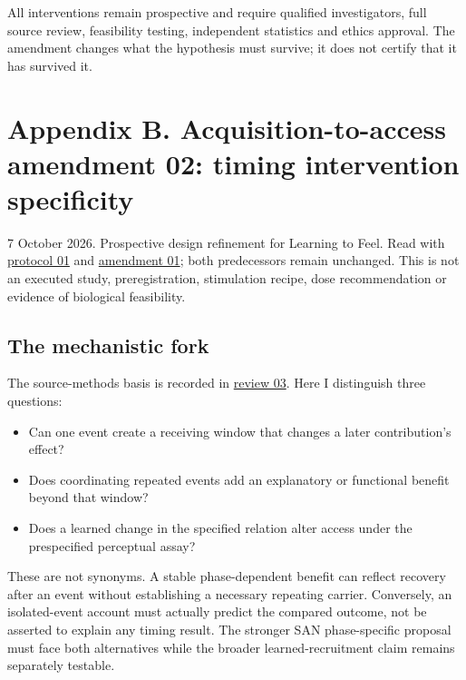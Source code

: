 \documentclass[
  american,
  11pt,
  letterpaper,
]{article}
\providecommand{\tightlist}{%
  \setlength{\itemsep}{0pt}\setlength{\parskip}{0pt}}
\begin{document}
All interventions remain prospective and require qualified investigators, full source review, feasibility testing, independent statistics and ethics approval. The amendment changes what the hypothesis must survive; it does not certify that it has survived it.

\clearpage
\endgroup
\hypertarget{appendix-b}{}

\section{Appendix B. Acquisition-to-access amendment 02: timing intervention specificity}\label{appendix-b.-acquisition-to-access-amendment-02-timing-intervention-specificity}

7 October 2026. Prospective design refinement for Learning to Feel. Read with \href{https://github.com/v5ma/v5ma.github.io/blob/master/papers/companions/learning-to-feel-v1.0/ARTIFACT-AVAILABILITY.md#artifact-1}{protocol 01} and \href{https://raw.githubusercontent.com/v5ma/v5ma.github.io/master/papers/companions/learning-to-feel-v1.0/Learning-to-Feel-Technical-Supplement-v1.0.pdf\#appendix-a}{amendment 01}; both predecessors remain unchanged. This is not an executed study, preregistration, stimulation recipe, dose recommendation or evidence of biological feasibility.

\subsection{The mechanistic fork}\label{the-mechanistic-fork}

The source-methods basis is recorded in \href{https://github.com/v5ma/v5ma.github.io/blob/master/papers/companions/learning-to-feel-v1.0/ARTIFACT-AVAILABILITY.md#artifact-12}{review 03}. Here I distinguish three questions:

\begin{itemize}
\tightlist
\item
  Can one event create a receiving window that changes a later contribution's effect?
\item
  Does coordinating repeated events add an explanatory or functional benefit beyond that window?
\item
  Does a learned change in the specified relation alter access under the prespecified perceptual assay?
\end{itemize}

These are not synonyms. A stable phase-dependent benefit can reflect recovery after an event without establishing a necessary repeating carrier. Conversely, an isolated-event account must actually predict the compared outcome, not be asserted to explain any timing result. The stronger SAN phase-specific proposal must face both alternatives while the broader learned-recruitment claim remains separately testable.
\end{document}

